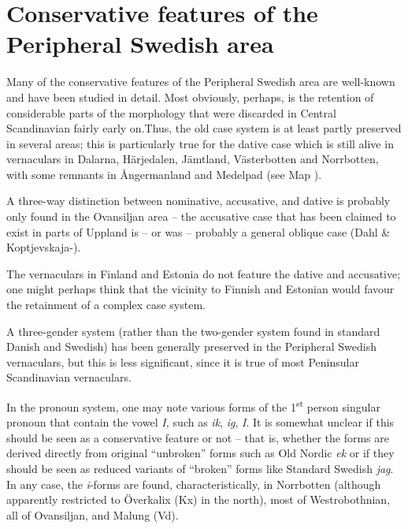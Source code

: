 \section{Conservative features of the Peripheral Swedish area}

\begin{styleBodyTextFirst}
Many of the conservative features of the Peripheral Swedish area are well-known and have been studied in detail. Most obviously, perhaps, is the retention of considerable parts of the morphology that were discarded in Central Scandinavian fairly early on.Thus, the old case system is at least partly preserved in several areas; this is particularly true for the dative case which is still alive in vernaculars in Dalarna, Härjedalen, Jämtland, Västerbotten and Norrbotten, with some remnants in Ångermanland and Medelpad (see Map ). 

\end{styleBodyTextFirst}

\begin{styleBodytextC}
A three-way distinction between nominative, accusative, and dative is probably only found in the Ovansiljan area – the accusative case that has been claimed to exist in parts of Uppland is – or was – probably a general oblique case (Dahl \& Koptjevskaja-\citet{Tamm2006}). 

\end{styleBodytextC}

\begin{styleBodytextC}
The vernaculars in Finland and Estonia do not feature the dative and accusative; one might perhaps think that the vicinity to Finnish and Estonian would favour the retainment of a complex case system. 

\end{styleBodytextC}

\begin{styleBodytextC}
A three-gender system (rather than the two-gender system found in standard Danish and Swedish) has been generally preserved in the Peripheral Swedish vernaculars, but this is less significant, since it is true of most Peninsular Scandinavian vernaculars. 

\end{styleBodytextC}

\begin{styleBodytextC}
In the pronoun system, one may note various forms of the 1\textsuperscript{st} person singular pronoun that contain the vowel \textit{I, }such as \textit{ik}, \textit{ig}, \textit{I}. It is somewhat unclear if this should be seen as a conservative feature or not – that is, whether the forms are derived directly from original “unbroken” forms such as Old Nordic \textit{ek }or if they should be seen as reduced variants of “broken” forms like Standard Swedish \textit{jag}. In any case, the \textit{i}{}-forms are found, characteristically, in Norrbotten (although apparently restricted to Överkalix (Kx) in the north), most of Westrobothnian, all of Ovansiljan, and Malung (Vd). 

\end{styleBodytextC}

